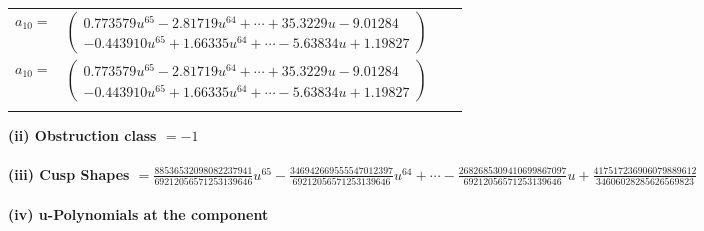 \documentclass[1p]{elsarticle_modified}
\theoremstyle{definition}
\begin{document}
\begin{tabular}{m{7pt} m{180pt} m{7pt} m{180pt} }
\flushright $a_{10}=$&$\begin{pmatrix}0.773579 u^{65}-2.81719 u^{64}+\cdots+35.3229 u-9.01284\\-0.443910 u^{65}+1.66335 u^{64}+\cdots-5.63834 u+1.19827\end{pmatrix}$\\ \flushright $a_{10}=$&$\begin{pmatrix}0.773579 u^{65}-2.81719 u^{64}+\cdots+35.3229 u-9.01284\\-0.443910 u^{65}+1.66335 u^{64}+\cdots-5.63834 u+1.19827\end{pmatrix}$\\&\end{tabular}
\flushleft \textbf{(ii) Obstruction class $= -1$}\\~\\
\flushleft \textbf{(iii) Cusp Shapes $= \frac{88536532098082237941}{69212056571253139646} u^{65}-\frac{346942669555547012397}{69212056571253139646} u^{64}+\cdots-\frac{2682685309410699867097}{69212056571253139646} u+\frac{417517236906079889612}{34606028285626569823}$}\\~\\
\newpage\renewcommand{\arraystretch}{1}
\flushleft \textbf{(iv) u-Polynomials at the component}\newline \\
\end{document}
